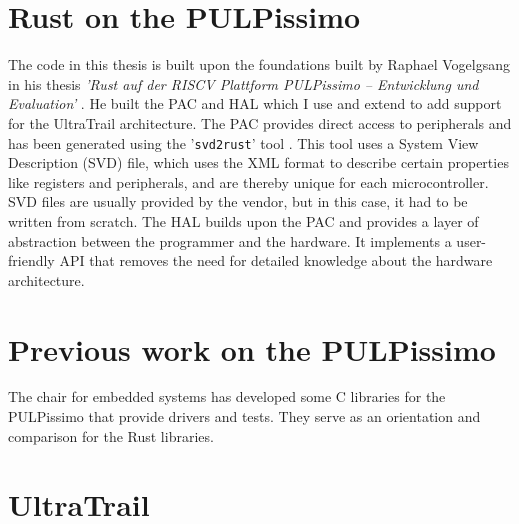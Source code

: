 
\section{Rust on the PULPissimo}

The code in this thesis is built upon the foundations built by Raphael Vogelgsang in his thesis \emph{'Rust auf der RISCV Plattform PULPissimo – Entwicklung und
Evaluation'} \cite{rust_pulp}.
He built the PAC and HAL which I use and extend to add support for the UltraTrail architecture.
The PAC provides direct access to peripherals and has been generated using the '\lstinline{svd2rust}' tool \cite{svd2rust}.
This tool uses a System View Description (SVD) file, which uses the XML format to describe certain properties like registers and peripherals, and are
thereby unique for each microcontroller.
SVD files are usually provided by the vendor, but in this case, it had to be written from scratch.
The HAL builds upon the PAC and provides a layer of abstraction between the programmer and the hardware.
It implements a user-friendly API that removes the need for detailed knowledge about the hardware architecture.

\section{Previous work on the PULPissimo}

The chair for embedded systems has developed some C libraries for the PULPissimo that provide drivers and tests.
They serve as an orientation and comparison for the Rust libraries.

\section{UltraTrail}

